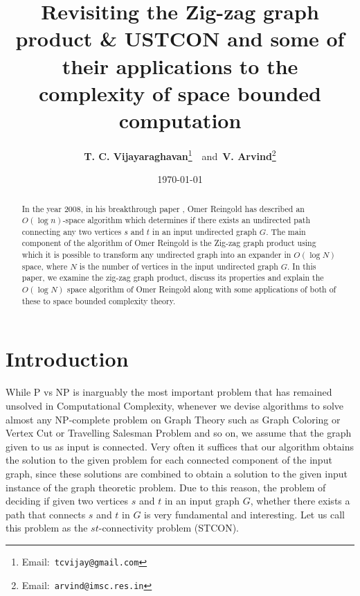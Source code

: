 \documentclass{article}
\title{\bf Revisiting the Zig-zag graph product \& USTCON and some of their applications to the complexity of space bounded computation}
\author{{{\bf T. C. Vijayaraghavan}\footnote{Email:~\tt tcvijay@gmail.com}}~~and~{{\bf V. Arvind}\footnote{Email:~\tt arvind@imsc.res.in}}}
\date{\today}
\begin{document}
\maketitle


\begin{abstract}
In the year 2008, in his breakthrough paper \cite{Rei2008}, Omer Reingold has described an $O(\log n)$-space algorithm which determines if there exists an undirected path connecting any two vertices $s$ and $t$ in an input undirected graph $G$. The main component of the algorithm of Omer Reingold is the Zig-zag graph product \cite{RVW2002, Rei2008} using which it is possible to transform any undirected graph into an expander in $O(\log N)$ space, where $N$ is the number of vertices in the input undirected graph $G$. In this paper, we examine the zig-zag graph product, discuss its properties and explain the $O(\log N)$ space algorithm of Omer Reingold \cite{Rei2008} along with some applications of both of these to space bounded complexity theory.
\end{abstract}

\pagestyle{myheadings}
\thispagestyle{plain}

\section{Introduction}
While P vs NP is inarguably the most important problem that has remained unsolved in Computational Complexity, whenever we devise algorithms to solve almost any NP-complete problem on Graph Theory such as Graph Coloring or Vertex Cut or Travelling Salesman Problem and so on, we assume that the graph given to us as input is connected. Very often it suffices that our algorithm obtains the solution to the given problem for each connected component of the input graph, since these solutions are combined to obtain a solution to the given input instance of the graph theoretic problem. Due to this reason, the problem of deciding if given two vertices $s$ and $t$ in an input graph $G$, whether there exists a path that connects $s$ and $t$ in $G$ is very fundamental and interesting. Let us call this problem as the $st$-connectivity problem (STCON).
\end{document}
